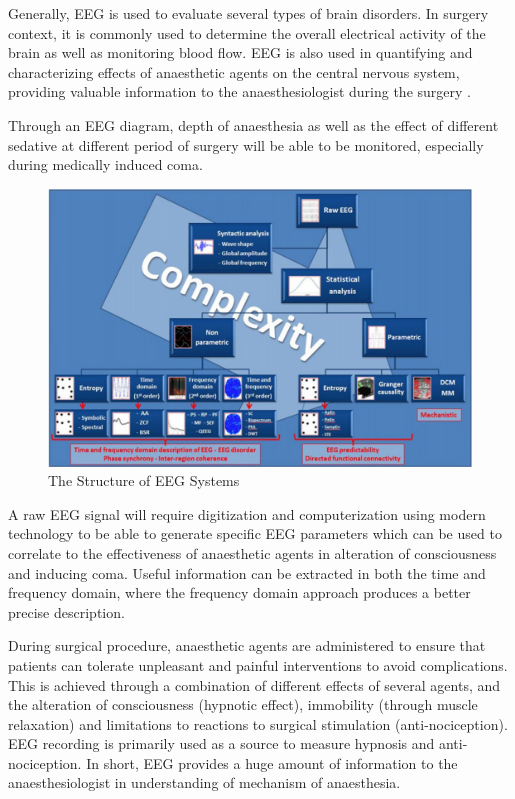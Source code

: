 Generally, EEG is used to evaluate several types of brain disorders. In surgery context, it is commonly used to determine the overall electrical activity of the brain as well as monitoring blood flow. EEG is also used in quantifying and characterizing effects of anaesthetic agents on the central nervous system, providing valuable information to the anaesthesiologist during the surgery \cite{jiahui2}. 

Through an EEG diagram, depth of anaesthesia as well as the effect of different sedative at different period of surgery will be able to be monitored, especially during medically induced coma.  

\begin{figure}[H]
	\centering
	\includegraphics[width=\linewidth]{jiahuipic1.jpg}
	\caption{The Structure of EEG Systems \cite{jiahui2}}
\end{figure}

A raw EEG signal will require digitization and computerization using modern technology to be able to generate specific EEG parameters which can be used to correlate to the effectiveness of anaesthetic agents in alteration of consciousness and inducing coma. Useful information can be extracted in both the time and frequency domain, where the frequency domain approach produces a better precise description. 

During surgical procedure, anaesthetic agents are administered to ensure that patients can tolerate unpleasant and painful interventions to avoid complications. This is achieved through a combination of different effects of several agents, and the alteration of consciousness (hypnotic effect), immobility (through muscle relaxation) and limitations to reactions to surgical stimulation (anti-nociception). EEG recording is primarily used as a source to measure hypnosis and anti-nociception. In short, EEG provides a huge amount of information to the anaesthesiologist in understanding of mechanism of anaesthesia. 

